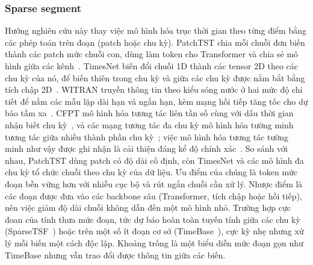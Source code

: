 \documentclass[conference]{IEEEtran}
\begin{document}
\subsubsection{Sparse segment}
Hướng nghiên cứu này thay việc mô hình hóa trục thời gian theo từng điểm bằng các phép toán trên đoạn (patch hoặc chu kỳ).
PatchTST chia mỗi chuỗi đơn biến thành các patch mức chuỗi con, dùng làm token cho Transformer và chia sẻ mô hình giữa các
kênh~\cite{Nie2023PatchTST}. TimesNet biến đổi chuỗi 1D thành các tensor 2D theo các chu kỳ của nó, để biến thiên trong
chu kỳ và giữa các chu kỳ được nắm bắt bằng tích chập 2D~\cite{Wu2023TimesNet}. WITRAN truyền thông tin theo kiểu sóng
nước ở hai mức độ chi tiết để nắm các mẫu lặp dài hạn và ngắn hạn, kèm mạng hồi tiếp tăng tốc cho dự báo
tầm xa~\cite{Jia2023WITRAN}. CFPT mô hình hóa tương tác liên tần số cùng với
dấu thời gian nhận biết chu kỳ~\cite{Kou2025CFPT}, và các mạng tương tác đa chu kỳ mô hình hóa tường minh tương tác giữa
nhiều thành phần chu kỳ~\cite{Xie2025MPIN}; việc mô hình hóa tương tác tường minh như vậy được ghi nhận là cải thiện đáng
kể độ chính xác~\cite{Kou2025CFPT,Xie2025MPIN}. So sánh với nhau, PatchTST dùng patch có độ dài cố định, còn TimesNet
và các mô hình đa chu kỳ tổ chức chuỗi theo chu kỳ của dữ liệu. Ưu điểm của chúng là token mức đoạn bền vững hơn
với nhiễu cục bộ và rút ngắn chuỗi cần xử lý. Nhược điểm là các đoạn được đưa vào các backbone sâu (Transformer, tích chập
hoặc hồi tiếp), nên việc giảm độ dài chuỗi không dẫn đến một mô hình nhỏ. Trường hợp cực đoan của tính thưa mức đoạn, tức dự báo hoàn toàn tuyến
tính giữa các chu kỳ (SparseTSF~\cite{Lin2024SparseTSF}) hoặc trên một số ít đoạn cơ sở
(TimeBase~\cite{Huang2025TimeBase}), cực kỳ nhẹ nhưng xử lý mỗi biến một cách độc lập. Khoảng trống là một biểu diễn mức
đoạn gọn như TimeBase nhưng vẫn trao đổi được thông tin giữa các biến.
\end{document}
